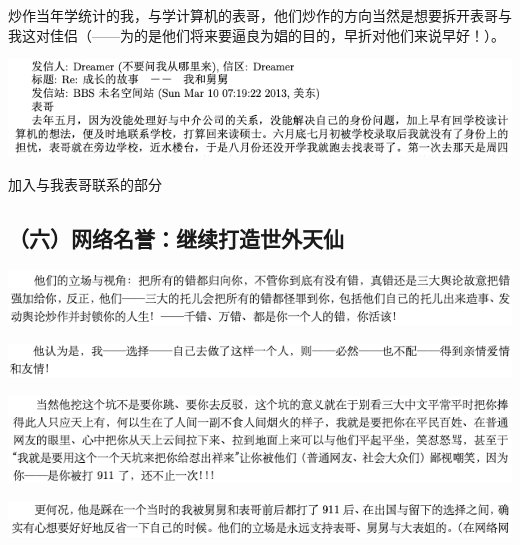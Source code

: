 \documentclass[9pt, b5paper]{article}
\begin{document}
炒作当年学统计的我，与学计算机的表哥，他们炒作的方向当然是想要拆开表哥与我这对佳侣（——为的是他们将来要逼良为娼的目的，早折对他们来说早好！）。

\begin{center}
\includegraphics[width=.9\linewidth]{./pic/backups_plans_20210424_133949.png}
\end{center}

加入与我表哥联系的部分

\subsection{（六）网络名誉：继续打造世外天仙}
\label{sec:orgf4ee5e8}

\begin{center}
\includegraphics[width=.9\linewidth]{./pic/backups_plans_20210424_094918.png}
\end{center}

\begin{center}
\includegraphics[width=.9\linewidth]{./pic/backups_plans_20210424_095706.png}
\end{center}

\begin{center}
\includegraphics[width=.9\linewidth]{./pic/backups_plans_20210424_095836.png}
\end{center}

\begin{center}
\includegraphics[width=.9\linewidth]{./pic/backups_plans_20210424_095855.png}
\end{center}
\end{document}
